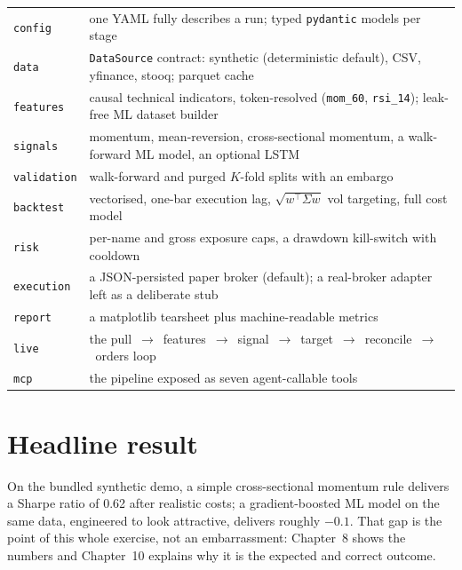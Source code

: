 \begin{table}[h]
\footnotesize
\centering
\begin{tabularx}{\textwidth}{L{2.6cm} X}
\toprule
{} &  \\
\midrule
\texttt{config} & one YAML fully describes a run; typed \texttt{pydantic} models per stage \\
\texttt{data} & \texttt{DataSource} contract: synthetic (deterministic default), CSV, yfinance, stooq; parquet cache \\
\texttt{features} & causal technical indicators, token-resolved (\texttt{mom\_60}, \texttt{rsi\_14}); leak-free ML dataset builder \\
\texttt{signals} & momentum, mean-reversion, cross-sectional momentum, a walk-forward ML model, an optional LSTM \\
\texttt{validation} & walk-forward and purged $K$-fold splits with an embargo \\
\texttt{backtest} & vectorised, one-bar execution lag, $\sqrt{w^\top\Sigma w}$ vol targeting, full cost model \\
\texttt{risk} & per-name and gross exposure caps, a drawdown kill-switch with cooldown \\
\texttt{execution} & a JSON-persisted paper broker (default); a real-broker adapter left as a deliberate stub \\
\texttt{report} & a matplotlib tearsheet plus machine-readable metrics \\
\texttt{live} & the pull~$\to$~features~$\to$~signal~$\to$~target~$\to$~reconcile~$\to$~orders loop \\
\texttt{mcp} & the pipeline exposed as seven agent-callable tools \\
\bottomrule
\end{tabularx}
\end{table}

\section*{Headline result}

On the bundled synthetic demo, a simple cross-sectional momentum rule delivers
a Sharpe ratio of 0.62 after realistic costs; a gradient-boosted ML model on
the same data, engineered to look attractive, delivers roughly $-0.1$. That gap
is the point of this whole exercise, not an embarrassment: Chapter~8 shows the
numbers and Chapter~10 explains why it is the expected and correct outcome.
